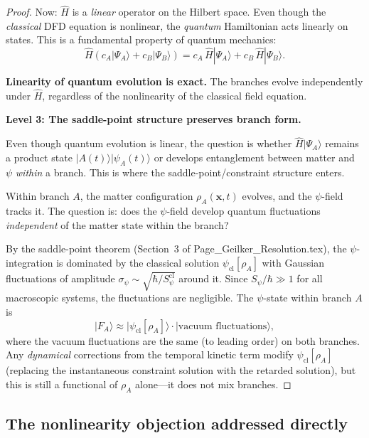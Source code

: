 \documentclass[12pt,a4paper]{article}
\begin{document}
\begin{proof}
Now: $\hat{H}$ is a \emph{linear} operator on the Hilbert space. Even
though the \emph{classical} DFD equation is nonlinear, the
\emph{quantum} Hamiltonian acts linearly on states. This is a
fundamental property of quantum mechanics:
\begin{equation}
\hat{H}(c_A|\Psi_A\rangle + c_B|\Psi_B\rangle)
= c_A\,\hat{H}|\Psi_A\rangle + c_B\,\hat{H}|\Psi_B\rangle.
\end{equation}

\textbf{Linearity of quantum evolution is exact.} The branches evolve
independently under $\hat{H}$, regardless of the nonlinearity of the
classical field equation.

\textbf{Level 3: The saddle-point structure preserves branch form.}

Even though quantum evolution is linear, the question is whether
$\hat{H}|\Psi_A\rangle$ remains a product state
$|A(t)\rangle|\psi_A(t)\rangle$ or develops entanglement between
matter and $\psi$ \emph{within} a branch. This is where the
saddle-point/constraint structure enters.

Within branch $A$, the matter configuration $\rho_A(\mathbf{x},t)$
evolves, and the $\psi$-field tracks it. The question is: does the
$\psi$-field develop quantum fluctuations \emph{independent} of the
matter state within the branch?

By the saddle-point theorem (Section~3 of Page\_Geilker\_Resolution.tex),
the $\psi$-integration is dominated by the classical solution
$\psi_\mathrm{cl}[\rho_A]$ with Gaussian fluctuations of amplitude
$\sigma_\psi \sim \sqrt{\hbar/S_\psi^\mathrm{cl}}$ around it. Since
$S_\psi/\hbar \gg 1$ for all macroscopic systems, the fluctuations are
negligible. The $\psi$-state within branch $A$ is
\begin{equation}
|F_A\rangle \approx |\psi_\mathrm{cl}[\rho_A]\rangle
\cdot |\text{vacuum fluctuations}\rangle,
\end{equation}
where the vacuum fluctuations are the same (to leading order) on both
branches. Any \emph{dynamical} corrections from the temporal kinetic term
modify $\psi_\mathrm{cl}[\rho_A]$ (replacing the instantaneous constraint
solution with the retarded solution), but this is still a functional of
$\rho_A$ alone---it does not mix branches.
\end{proof}

\subsection{The nonlinearity objection addressed directly}
\end{document}
